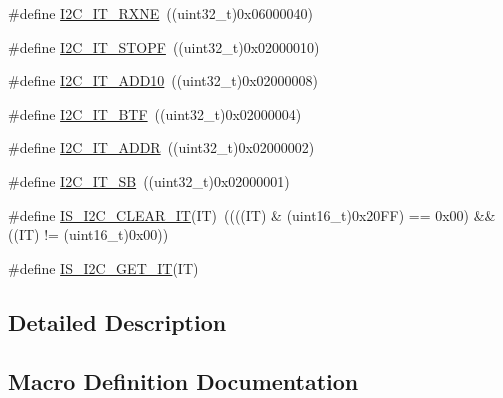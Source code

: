\begin{DoxyCompactItemize}
\item 
\#define \hyperlink{group___i2_c__interrupts__definition_gac95135720c0de2fd01c44c3f7b6c81d4}{I2\+C\+\_\+\+I\+T\+\_\+\+R\+X\+NE}~((uint32\+\_\+t)0x06000040)
\item 
\#define \hyperlink{group___i2_c__interrupts__definition_ga741e098abb485b327c7668518117e415}{I2\+C\+\_\+\+I\+T\+\_\+\+S\+T\+O\+PF}~((uint32\+\_\+t)0x02000010)
\item 
\#define \hyperlink{group___i2_c__interrupts__definition_ga8a9bc5a1dee3bbd41347b19cf117c0f3}{I2\+C\+\_\+\+I\+T\+\_\+\+A\+D\+D10}~((uint32\+\_\+t)0x02000008)
\item 
\#define \hyperlink{group___i2_c__interrupts__definition_gaef469fef934f655614b7cffd00b87ceb}{I2\+C\+\_\+\+I\+T\+\_\+\+B\+TF}~((uint32\+\_\+t)0x02000004)
\item 
\#define \hyperlink{group___i2_c__interrupts__definition_gaf68f1eda33dcb13626597f477d044025}{I2\+C\+\_\+\+I\+T\+\_\+\+A\+D\+DR}~((uint32\+\_\+t)0x02000002)
\item 
\#define \hyperlink{group___i2_c__interrupts__definition_gaec2fb9bbd0e1b128b4450b2a7b312896}{I2\+C\+\_\+\+I\+T\+\_\+\+SB}~((uint32\+\_\+t)0x02000001)
\item 
\#define \hyperlink{group___i2_c__interrupts__definition_ga368c05fc9aadd7bb4d23280791b5a751}{I\+S\+\_\+\+I2\+C\+\_\+\+C\+L\+E\+A\+R\+\_\+\+IT}(IT)~((((IT) \& (uint16\+\_\+t)0x20\+F\+F) == 0x00) \&\& ((\+I\+T) != (uint16\+\_\+t)0x00))
\item 
\#define \hyperlink{group___i2_c__interrupts__definition_gab3d113f3d6b6e6f7896c5d7a8d8c2d01}{I\+S\+\_\+\+I2\+C\+\_\+\+G\+E\+T\+\_\+\+IT}(IT)
\end{DoxyCompactItemize}


\subsection{Detailed Description}


\subsection{Macro Definition Documentation}
\mbox{\label{group___i2_c__interrupts__definition_ga8a9bc5a1dee3bbd41347b19cf117c0f3}} 
